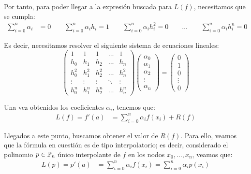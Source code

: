 \begin{ejercicio}
    Por tanto, para poder llegar a la expresión buscada para $L(f)$, necesitamos que se cumpla:
    \begin{align*}
        \sum_{i=0}^n \alpha_i &= 0\qquad 
        \sum_{i=0}^n \alpha_i h_i = 1\qquad
        \sum_{i=0}^n \alpha_i h_i^2 = 0\qquad
        \dots\qquad
        \sum_{i=0}^n \alpha_i h_i^n = 0
    \end{align*}

    Es decir, necesitamos resolver el siguiente sistema de ecuaciones lineales:
    \begin{equation}\label{eq:1}
        \begin{pmatrix}
            1 & 1 & 1 & \dots & 1\\
            h_0 & h_1 & h_2 & \dots & h_n\\
            h_0^2 & h_1^2 & h_2^2 & \dots & h_n^2\\
            \vdots & \vdots & \vdots & \ddots & \vdots\\
            h_0^n & h_1^n & h_2^n & \dots & h_n^n
        \end{pmatrix}
        \begin{pmatrix}
            \alpha_0\\
            \alpha_1\\
            \alpha_2\\
            \vdots\\
            \alpha_n
        \end{pmatrix}
        =
        \begin{pmatrix}
            0\\
            1\\
            0\\
            \vdots\\
            0
        \end{pmatrix}
    \end{equation}

    Una vez obtenidos los coeficientes $\alpha_i$, tenemos que:
    \begin{align*}
        L(f) = f'(a) &= \sum_{i=0}^n \alpha_i f(x_i) + R(f)
    \end{align*}

    Llegados a este punto, buscamos obtener el valor de $R(f)$. Para ello, veamos que la fórmula en cuestión es de tipo interpolatorio; es decir, considerado el polinomio $p\in \mathbb{P}_n$ único interpolante de $f$ en los nodos $x_0,\dots,x_n$, veamos que:
    \begin{align*}
        L(p) = p'(a) &= \sum_{i=0}^n \alpha_i f(x_i) = \sum_{i=0}^n \alpha_i p(x_i)
    \end{align*}


\end{ejercicio}
